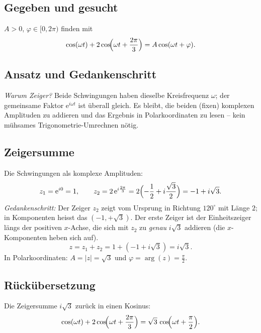 
\subsection*{Gegeben und gesucht}
$A>0$, $\varphi\in[0,2\pi)$ finden mit
\begin{equation*}
  \cos(\omega t)+2\cos\!\Bigl(\omega t+\frac{2\pi}{3}\Bigr)
  =A\cos(\omega t+\varphi).
\end{equation*}

\subsection*{Ansatz und Gedankenschritt}
\emph{Warum Zeiger?} Beide Schwingungen haben dieselbe Kreisfrequenz
$\omega$; der gemeinsame Faktor $\mathrm e^{i\omega t}$ ist überall
gleich. Es bleibt, die beiden (fixen) komplexen Amplituden zu addieren und
das Ergebnis in Polarkoordinaten zu lesen -- kein mühsames
Trigonometrie-Umrechnen nötig.

\subsection*{Zeigersumme}
Die Schwingungen als komplexe Amplituden:
\begin{equation*}
  z_1=\mathrm e^{i0}=1,\qquad
  z_2=2\,\mathrm e^{i\frac{2\pi}{3}}
  =2\Bigl(-\frac12+i\frac{\sqrt3}{2}\Bigr)=-1+i\sqrt3 .
\end{equation*}
\emph{Gedankenschritt:} Der Zeiger $z_2$ zeigt vom Ursprung in Richtung
$120^\circ$ mit Länge $2$; in Komponenten heisst das $(-1,+\sqrt3)$. Der
erste Zeiger ist der Einheitszeiger längs der positiven $x$-Achse, die
sich mit $z_2$ zu \emph{genau} $i\sqrt3$ addieren (die $x$-Komponenten
heben sich auf).
\begin{equation*}
  z=z_1+z_2=1+(-1+i\sqrt3)=i\sqrt3 .
\end{equation*}
In Polarkoordinaten: $A=|z|=\sqrt3$ und $\varphi=\arg(z)=\frac\pi2$.

\subsection*{Rückübersetzung}
Die Zeigersumme $i\sqrt3$ zurück in einen Kosinus:
\begin{equation*}
  \cos(\omega t)+2\cos\!\Bigl(\omega t+\frac{2\pi}{3}\Bigr)
  =\sqrt3\,\cos\!\Bigl(\omega t+\frac\pi2\Bigr).
\end{equation*}

